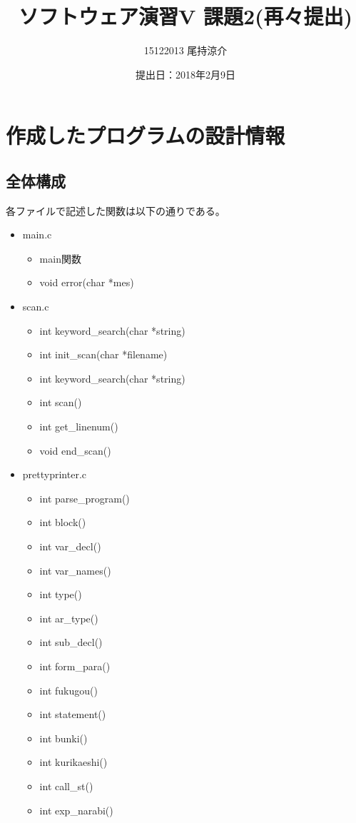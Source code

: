 \documentclass{jarticle}
\title{ソフトウェア演習V 課題2(再々提出)}
\author{15122013 尾持涼介}
\date{提出日：2018年2月9日}
\makeatletter
\def\maketitle{%
\null
\thispagestyle{empty}%
\vfill
\begin{center}\leavevmode
\normalfont
{\LARGE \@title\par}%
\vskip 1cm
{\Large \@author\par}%
\vskip 1cm
{\Large \@date\par}%
\end{center}%
\vfill
\null
\@thanks%
\cleardoublepage
}
\makeatother
\begin{document}
\maketitle

\section{作成したプログラムの設計情報}
\subsection{全体構成}
各ファイルで記述した関数は以下の通りである。
\begin{itemize}
  \item main.c
  \begin{itemize}
    \item main関数
    \item void error(char *mes)
  \end{itemize}
  \item scan.c
  \begin{itemize}
    \item int keyword\_search(char *string)
    \item int init\_scan(char *filename)
    \item int keyword\_search(char *string)
    \item int scan()
    \item int get\_linenum()
    \item void end\_scan()
  \end{itemize}
  \item prettyprinter.c
  \begin{itemize}
    \item int parse\_program()
    \item int block()
    \item int var\_decl()
    \item int var\_names()
    \item int type()
    \item int ar\_type()
    \item int sub\_decl()
    \item int form\_para()
    \item int fukugou()
    \item int statement()
    \item int bunki()
    \item int kurikaeshi()
    \item int call\_st()
    \item int exp\_narabi()

\end{itemize}
\end{itemize}
\end{document}
